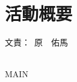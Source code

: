 \documentclass[a4paper]{jarticle}
\newcommand{\resp}[1]{\begin{flushright}文責：~#1\end{flushright}~\\}
\begin{document}
\fi

\section{活動概要}
  \resp{原　佑馬}

\expandafter\ifx\csname MAIN \endcsname\relax
  
\end{document}
